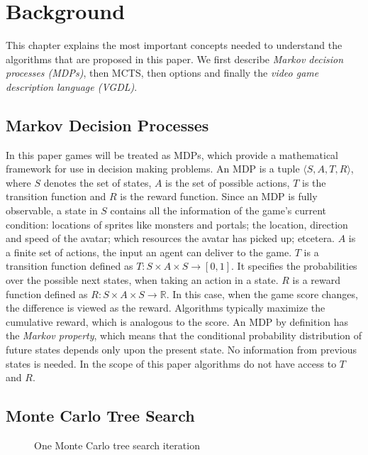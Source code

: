 \section{Background}
\label{sec:background}

This chapter explains the most important concepts needed to understand the
algorithms that are proposed in this paper. We first describe \emph{Markov
decision processes (MDPs)}, then  MCTS, then options and finally the \emph{video
game description language (VGDL)}.

\subsection{Markov Decision Processes}
\label{subsec:mdps}
In this paper games will be treated as MDPs, which provide a mathematical
framework for use in decision making problems. An MDP is a 
tuple $\langle S, A, T, R \rangle$, where $S$ denotes the set of states, $A$ is
the set of possible actions, $T$ is the transition function and $R$ is the
reward function. Since an MDP is fully observable, a state in $S$ contains all
the information of the game's current condition: locations of sprites like
monsters and portals; the location, direction and speed of the avatar; which
resources the avatar has picked up; etcetera. $A$ is a finite set of actions,
the input an agent can deliver to the game. $T$ is a transition function defined
as $T : S \times A \times S \rightarrow \left[0,1\right]$. It specifies the
probabilities over the possible next states, when taking an action in a state.
$R$ is a reward function defined as $R: S \times A \times S \rightarrow
\mathbb{R}$. In this case, when the game score changes, the difference is viewed
as the reward.  Algorithms typically maximize the cumulative reward, which is
analogous to the score. An MDP by definition has the \emph{Markov property},
which means that the conditional probability distribution of future states
depends only upon the present state. No information from previous states is
needed. In the scope of this paper algorithms do not have access to $T$ and
$R$.

\subsection{Monte Carlo Tree Search}
\begin{figure}
	\centering
	\caption{One Monte Carlo tree search iteration}
	\label{fig:mcts}
\end{figure}

